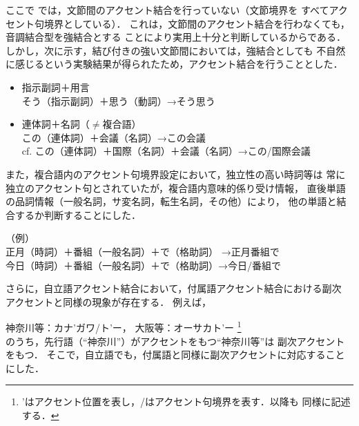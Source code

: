 ここで
\cite{Miyazaki1}では，文節間のアクセント結合を行っていない（文節境界を
すべてアクセント句境界としている）．
これは，文節間のアクセント結合を行わなくても，音調結合型を強結合とする
ことにより実用上十分と判断しているからである．
しかし，次に示す，結び付きの強い文節間においては，強結合としても
不自然に感じるという実験結果が得られたため，アクセント結合を行うこととした．
\begin{itemize}
\item 指示副詞＋用言\\
	そう（指示副詞）＋思う（動詞）→そう思う
\item 連体詞＋名詞（$\neq$複合語）\\
この（連体詞）＋会議（名詞）→この会議\\
cf. この（連体詞）＋国際（名詞）＋会議（名詞）→この/国際会議
\end{itemize}

また，複合語内のアクセント句境界設定において，独立性の高い時詞等は
常に独立のアクセント句とされていたが，複合語内意味的係り受け情報，
直後単語の品詞情報（一般名詞，サ変名詞，転生名詞，その他）により，
他の単語と結合するか判断することにした．

（例）\\
\hspace*{1cm}正月（時詞）＋番組（一般名詞）＋で（格助詞） →正月番組で\\
\hspace*{1cm}今日（時詞）＋番組（一般名詞）＋で（格助詞）→今日/番組で

さらに，自立語アクセント結合において，付属語アクセント結合における副次
アクセントと同様の現象が存在する．
例えば，

神奈川等：カナ'ガワ/ト'ー， 大阪等：オーサカト'ー
\footnote{'はアクセント位置を表し，/はアクセント句境界を表す．以降も
同様に記述する．}
\\
のうち，先行語（``神奈川''）がアクセントをもつ``神奈川等''は
副次アクセントをもつ．
そこで，自立語でも，付属語と同様に副次アクセントに対応することにした．

